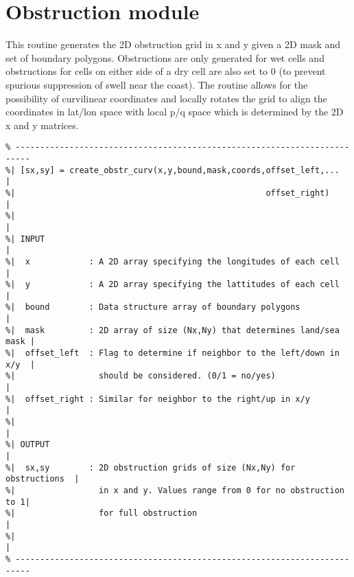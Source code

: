 \documentclass[12pt]{article}
\begin{document}
\section{Obstruction module}
This routine generates the 2D obstruction grid in x and y given a 2D mask and set of boundary polygons. Obstructions are only generated for wet cells and obstructions for cells on either side of a dry cell are also set to 0 (to prevent spurious suppression of swell near the coast). The routine allows for the possibility of curvilinear coordinates and locally rotates the grid to align the coordinates in lat/lon space with local p/q space which is determined by the 2D x and y matrices. 
\begin{verbatim}
% -------------------------------------------------------------------------
%| [sx,sy] = create_obstr_curv(x,y,bound,mask,coords,offset_left,...      |
%|                                                   offset_right)        |
%|                                                                        |
%| INPUT                                                                  |
%|  x            : A 2D array specifying the longitudes of each cell      | 
%|  y            : A 2D array specifying the lattitudes of each cell      | 
%|  bound        : Data structure array of boundary polygons              |
%|  mask         : 2D array of size (Nx,Ny) that determines land/sea mask |
%|  offset_left  : Flag to determine if neighbor to the left/down in x/y  |
%|                 should be considered. (0/1 = no/yes)                   |
%|  offset_right : Similar for neighbor to the right/up in x/y            |
%|                                                                        |
%| OUTPUT                                                                 |
%|  sx,sy        : 2D obstruction grids of size (Nx,Ny) for obstructions  |
%|                 in x and y. Values range from 0 for no obstruction to 1| 
%|                 for full obstruction                                   | 
%|                                                                        |
% -------------------------------------------------------------------------
\end{verbatim} 
\end{document}
